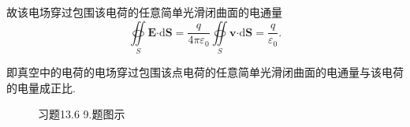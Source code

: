 \documentclass[12pt,UTF8]{ctexart}
\newcommand{\md}[1]{\mathrm d#1}
\newcommand{\BSOIInt}[2]{\oiint\limits_{#1}#2}
\begin{document}
\begin{enumerate}
{故该电场穿过包围该电荷的任意简单光滑闭曲面的电通量
\[\BSOIInt S{\bm E\bm\cdot\md\bm S}=\frac q{4\pi\varepsilon_0}\BSOIInt S{\bm v\bm\cdot\md\bm S}=\frac q{\varepsilon_0}.\]

即真空中的电荷的电场穿过包围该点电荷的任意简单光滑闭曲面的电通量与该电荷的电量成正比.

}

\begin{figure}[H]
\begin{center}
\end{center}
\end{figure}
\addtocounter{figure}{-1}
\begin{figure}[H]
\addtocounter{figure}{1}
\begin{center}
\end{center}
\caption{习题13.6 9.题图示}
\label{13-6-9}
\end{figure}


\end{enumerate}
\end{document}
